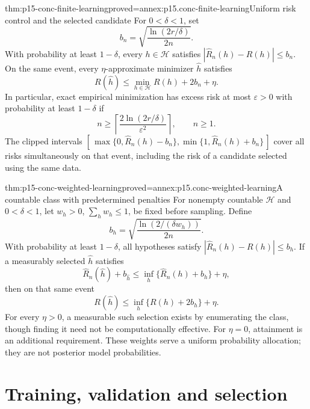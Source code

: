 \begin{hbtheorem}{thm:p15-conc-finite-learning}{proved=annex:p15.conc-finite-learning}{Uniform risk control and the selected candidate}
For \(0<\delta<1\), set
\[
                  b_n=\sqrt{\frac{\ln(2r/\delta)}{2n}}.
\]
With probability at least \(1-\delta\), every \(h\in\mathcal H\)
satisfies \(|\widehat R_n(h)-R(h)|\leq b_n\).
On the same event, every \(\eta\)-approximate minimizer
\(\widehat h\) satisfies
\[
 R(\widehat h)\leq\min_{h\in\mathcal H}R(h)+2b_n+\eta.
\]
In particular, exact empirical minimization has excess risk
at most \(\varepsilon>0\) with probability at least \(1-\delta\) if
\[
                 n\geq\left\lceil
                     \frac{2\ln(2r/\delta)}{\varepsilon^2}
                              \right\rceil,\qquad n\geq1.
\]
The clipped intervals
\([\,\max\{0,\widehat R_n(h)-b_n\},
       \min\{1,\widehat R_n(h)+b_n\}\,]\)
cover all risks simultaneously on that event, including the risk
of a candidate selected using the same data.
\end{hbtheorem}

\begin{hbtheorem}{thm:p15-conc-weighted-learning}{proved=annex:p15.conc-weighted-learning}{A countable class with predetermined penalties}
For nonempty countable \(\mathcal H\) and \(0<\delta<1\), let \(w_h>0\),
\(\sum_hw_h\leq1\), be fixed before sampling. Define
\[
                  b_h=\sqrt{\frac{\ln(2/(\delta w_h))}{2n}}.
\]
With probability at least \(1-\delta\), all hypotheses satisfy
\(|\widehat R_n(h)-R(h)|\leq b_h\).
If a measurably selected \(\widehat h\) satisfies
\[
 \widehat R_n(\widehat h)+b_{\widehat h}
       \leq\inf_h\{\widehat R_n(h)+b_h\}+\eta,
\]
then on that same event
\[
              R(\widehat h)\leq
                    \inf_h\{R(h)+2b_h\}+\eta.
\]
For every \(\eta>0\), a measurable such selection exists by
enumerating the class, though finding it need not be computationally
effective. For \(\eta=0\), attainment is an additional requirement.
These weights serve a uniform probability allocation; they are
not posterior model probabilities.
\end{hbtheorem}

\section{Training, validation and selection}

